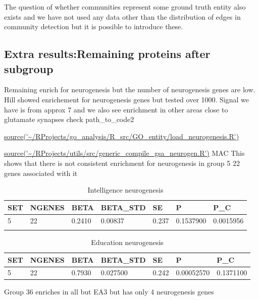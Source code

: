The question of whether communities represent some ground truth entity also exists \cite{peel2017ground}  and we have not used any data other than the distribution of edges in community detection but it is possible to introduce these.  \cite{newman2016structure} 


 

\subsection{Extra results:Remaining proteins after subgroup}
Remaining enrich for neurogenesis but the number of neurogenesis genes are low. Hill showed enrichement for neurogenesis genes but tested over 1000. Signal we have is from approx 7 and we also see enrichment in other areas close to glutamate synapses
check path\_to\_code2

\url{source('~/RProjects/go_analysis/R_src/GO_entity/load_neurogenesis.R')}

\url{source('~/RProjects/utils/src/generic_compile_gsa_neurogen.R')} MAC
This shows that there is not consistent enrichment for neurogenesis in group 5 22 genes associated with it 
\begin{table}[]
    \centering
    \begin{tabular}{lllllll}
        SET& NGENES&    BETA &BETA\_STD  &  SE      &   P  & P\_C\\
        \hline
  5  &   22&  0.2410&  0.00837& 0.237& 0.1537900& 0.0015956\\   
         & 
    \end{tabular}
    \caption{Intelligence neurogenesis}
    \label{tab:Intelligence neurogenesis}
\end{table}

\begin{table}[]
    \centering
    \begin{tabular}{lllllll}
        SET& NGENES&    BETA &BETA\_STD  &  SE      &   P  & P\_C\\
        \hline
  5   &  22&  0.7930&  0.027500& 0.242& 0.00052570 &0.1371100\\

 \end{tabular}
    \caption{Education neurogenesis}
    \label{tab:Education neurogenesis}
\end{table}

Group 36 enriches in all but EA3 but has only 4 neurogenesis genes 


